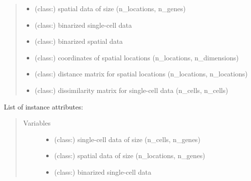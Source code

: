 \documentclass[letterpaper,10pt,english]{sphinxmanual}
\begin{document}
\begin{fulllineitems}
\begin{quote}
\begin{description}
\begin{itemize}
\item {} 
 (class:) \textendash{} spatial data of size (n\_locations, n\_genes)

\item {} 
 (class:) \textendash{} binarized single-cell data

\item {} 
 (class:) \textendash{} binarized spatial data

\item {} 
 (class:) \textendash{} coordinates of spatial locations (n\_locations, n\_dimensions)

\item {} 
 (class:) \textendash{} distance matrix for spatial locations (n\_locations, n\_locations)

\item {} 
 (class:) \textendash{} dissimilarity matrix for single-cell data (n\_cells, n\_cells)

\end{itemize}

\end{description}\end{quote}

List of instance attributes:
\begin{quote}\begin{description}
\item[{Variables}] \leavevmode\begin{itemize}
\item {} 
 (class:) \textendash{} single-cell data of size (n\_cells, n\_genes) 

\item {} 
 (class:) \textendash{} spatial data of size (n\_locations, n\_genes) 

\item {} 
 (class:) \textendash{} binarized single-cell data 


\end{itemize}
\end{description}
\end{quote}
\end{fulllineitems}
\end{document}
